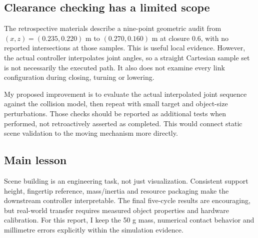 \subsection{Clearance checking has a limited scope}
The retrospective materials describe a nine-point geometric audit from $(x,z)=(0.235,0.220)$ m to $(0.270,0.160)$ m at closure 0.6, with no reported intersections at those samples. This is useful local evidence. However, the actual controller interpolates joint angles, so a straight Cartesian sample set is not necessarily the executed path. It also does not examine every link configuration during closing, turning or lowering.

My proposed improvement is to evaluate the actual interpolated joint sequence against the collision model, then repeat with small target and object-size perturbations. Those checks should be reported as additional tests when performed, not retroactively asserted as completed. This would connect static scene validation to the moving mechanism more directly.
\subsection{Main lesson}
Scene building is an engineering task, not just visualization. Consistent support height, fingertip reference, mass/inertia and resource packaging make the downstream controller interpretable. The final five-cycle results are encouraging, but real-world transfer requires measured object properties and hardware calibration. For this report, I keep the 50 g mass, numerical contact behavior and millimetre errors explicitly within the simulation evidence.
\githubsection
{}

